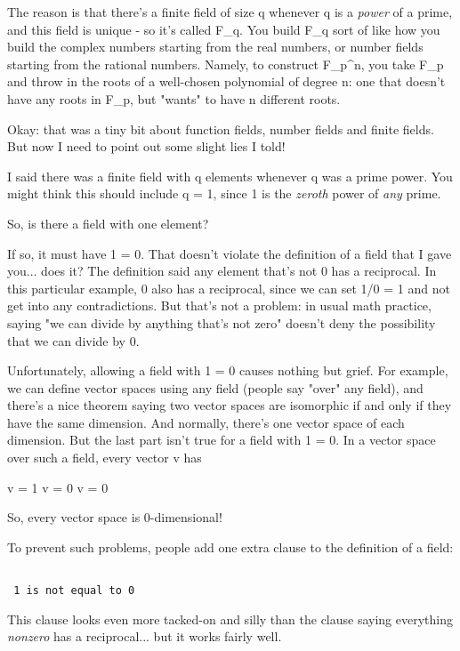The reason is that there's a finite field of size q whenever q is a
\emph{power} of a prime, and this field is unique - so it's called
F_{q}.  You build F_{q} sort of like how you build the
complex numbers starting from the real numbers, or number fields
starting from the rational numbers.  Namely, to construct
F_{p^{n}}, you take F_{p} and throw in the
roots of a well-chosen polynomial of degree n: one that doesn't have
any roots in F_{p}, but "wants" to have n different
roots.

Okay: that was a tiny bit about function fields, number fields and finite
fields.  But now I need to point out some slight lies I told!  

I said there was a finite field with q elements whenever q was a prime
power.  You might think this should include q = 1, since 1 is the
\emph{zeroth} power of \emph{any} prime.  

So, is there a field with one element?  

If so, it must have 1 = 0.  That doesn't violate the definition of
a field that I gave you... does it?  The definition said any element 
that's not 0 has a reciprocal.  In this particular example, 0 also has
a reciprocal, since we can set 1/0 = 1 and not get into any contradictions.  
But that's not a problem: in usual math practice, saying "we can divide 
by anything that's not zero" doesn't deny the possibility that we can
divide by 0.

Unfortunately, allowing a field with 1 = 0 causes nothing but grief.
For example, we can define vector spaces using any field (people say
"over" any field), and there's a nice theorem saying two
vector spaces are isomorphic if and only if they have the same
dimension.  And normally, there's one vector space of each dimension.
But the last part isn't true for a field with 1 = 0.  In a vector
space over such a field, every vector v has

v = 1 v = 0 v = 0

So, every vector space is 0-dimensional!  

To prevent such problems, people add one extra clause to the definition
of a field:


\begin{verbatim}

 1 is not equal to 0
\end{verbatim}
    
This clause looks even more tacked-on and silly than the clause
saying everything \emph{nonzero} has a reciprocal... but it works fairly
well.

